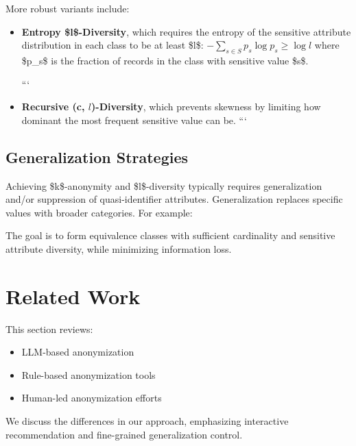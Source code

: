 \documentclass{article}
\begin{document}
More robust variants include:
\begin{itemize}
\item \textbf{Entropy \$l\$-Diversity}, which requires the entropy of the sensitive attribute distribution in each class to be at least \$\log l\$:
$     -\sum_{s \in S} p_s \log p_s \geq \log l
    $
where \$p\_s\$ is the fraction of records in the class with sensitive value \$s\$.

```
\item \textbf{Recursive (c, $l$)-Diversity}, which prevents skewness by limiting how dominant the most frequent sensitive value can be.
```

\end{itemize}

\subsection{Generalization Strategies}

Achieving \$k\$-anonymity and \$l\$-diversity typically requires generalization and/or suppression of quasi-identifier attributes. Generalization replaces specific values with broader categories. For example:
\begin{itemize}
\item Age: 23 \$\rightarrow\$ \[21--30]
\item ZIP Code: 12345 \$\rightarrow\$ 123\textbf{\*\*}
\end{itemize}

The goal is to form equivalence classes with sufficient cardinality and sensitive attribute diversity, while minimizing information loss.




\section{Related Work}
This section reviews:
\begin{itemize}
    \item LLM-based anonymization
    \item Rule-based anonymization tools
    \item Human-led anonymization efforts
\end{itemize}
We discuss the differences in our approach, emphasizing interactive recommendation and fine-grained generalization control.
\end{document}
